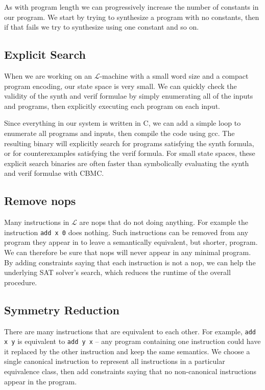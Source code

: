 \documentclass[a4paper]{llncs}
\begin{document}
As with program length we can progressively increase the number of constants in
our program.  We start by trying to synthesize a program with no constants, then
if that fails we try to synthesize using one constant and so on.

\subsection{Explicit Search}
When we are working on an $\mathcal{L}$-machine with a small word size and
a compact program encoding, our state space is very small.
We can quickly check the validity of the {\sc synth} and {\sc verif} formulae
by simply enumerating all of the inputs and programs, then explicitly
executing each program on each input.

Since everything in our system is written in C, we can add a simple loop
to enumerate all programs and inputs, then compile the code using {\sc gcc}.
The resulting binary will explicitly search for programs satisfying the {\sc synth}
formula, or for counterexamples satisfying the {\sc verif} formula.
For small state spaces, these explicit search binaries are often faster
than symbolically evaluating the {\sc synth} and {\sc verif} formulae with
{\sc CBMC}.

\subsection{Remove nops}
Many instructions in $\mathcal{L}$ are nops that do not doing anything.
For example the instruction \verb|add x 0| does nothing.  Such instructions
can be removed from any program they appear in to leave a semantically
equivalent, but shorter, program.  We can therefore be sure that nops
will never appear in any minimal program.  By adding constraints saying that
each instruction is not a nop, we can help the underlying SAT solver's
search, which reduces the runtime of the overall procedure.

\subsection{Symmetry Reduction}
There are many instructions that are equivalent to each other.  For example,
\verb|add x y| is equivalent to \verb|add y x| -- any program containing
one instruction could have it replaced by the other instruction and
keep the same semantics.  We choose a single canonical instruction to
represent all instructions in a particular equivalence class, then add
constraints saying that no non-canonical instructions appear in the program.
\end{document}
